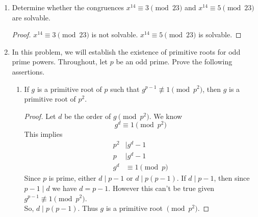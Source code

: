 \documentclass[11pt]{article}
\theoremstyle{definition}
\newcommand{\ZZ}{\mathbb{Z}}
\begin{document}
\begin{enumerate}
\begin{enumerate}
\begin{proof}
        \end{proof}
        \item $7^x\equiv 7\pmod{17}$
        \begin{proof}
            Since $17$ is prime, the multiplicative group of integers $\pmod{17}$ has order $16$. 
            So the exponents $x$ and $1$ are congruent $\pmod{16}$.
            \[ 
                x\equiv 1\pmod{16}
            \]
            So, 
            \[
                x = 1 + 16y
            \]
            for some $y\in\ZZ$. \\
            The smallest solution is $x=1$. So, $x=1$ satisfies the congruence.

        \end{proof}
    \end{enumerate}

    \item Determine whether the congruences $x^{14}\equiv 3 \pmod{23}$ and $x^{14} \equiv 5 \pmod{23}$ are solvable.
    \begin{proof}
        $x^{14}\equiv 3 \pmod{23}$ is not solvable. 
        $x^{14} \equiv 5 \pmod{23}$ is solvable.
    \end{proof}

    \item In this problem, we will establish the existence of primitive roots for odd prime powers. Throughout, let $p$ be an odd prime. Prove the following assertions.
    \begin{enumerate}
        \item If $g$ is a primitive root of $p$ such that $g^{p-1}\not\equiv 1\pmod{p^2}$, then $g$ is a primitive root of $p^2$.
        \begin{proof}
            Let $d$ be the order of $g\pmod{p^2}$. We know
            \[
                g^d\equiv 1\pmod{p^2}
            \]
            This implies 
            \begin{align*}
                p^2 &\mid g^d - 1 \\
                p &\mid g^d - 1 \\
                g^d &\equiv 1\pmod{p}
            \end{align*}
            Since $p$ is prime, either $d\mid p-1$ or $d\mid p(p-1)$. 
            If $d\mid p-1$, then since $p-1\mid d$ we have $d=p-1$. However this can't be true 
            given $g^{p-1}\not\equiv 1\pmod{p^2}$. \\
            So, $d\mid p(p-1)$.
            Thus $g$ is a primitive root $\pmod{p^2}$.
        \end{proof}
        

\end{enumerate}
\end{enumerate}
\end{document}
